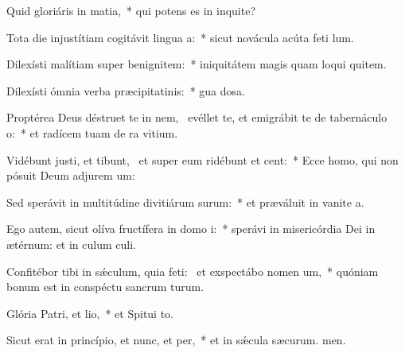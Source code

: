 \item Quid gloriáris in matia,~* qui potens es in inquite?
\item Tota die injustítiam cogitávit lingua a:~* sicut novácula acúta feti lum.
\item Dilexísti malítiam super benignitem:~* iniquitátem magis quam loqui quitem.
\item Dilexísti ómnia verba præcipitatinis:~* gua dosa.
\item Proptérea Deus déstruet te in nem,~\pscross{} evéllet te, et emigrábit te de tabernáculo o:~* et radícem tuam de ra vitium.
\item Vidébunt justi, et tibunt,~\pscross{} et super eum ridébunt et cent:~* Ecce homo, qui non pósuit Deum adjurem um:
\item Sed sperávit in multitúdine divitiárum surum:~* et præváluit in vanite a.
\item Ego autem, sicut olíva fructífera in domo i:~* sperávi in misericórdia Dei in ætérnum: et in culum culi.
\item Confitébor tibi in sǽculum, quia feti:~\pscross{} et exspectábo nomen um,~* quóniam bonum est in conspéctu sancrum turum.
\item Glória Patri, et lio,~* et Spitui to.
\item Sicut erat in princípio, et nunc, et per,~* et in sǽcula sæcurum. men.
